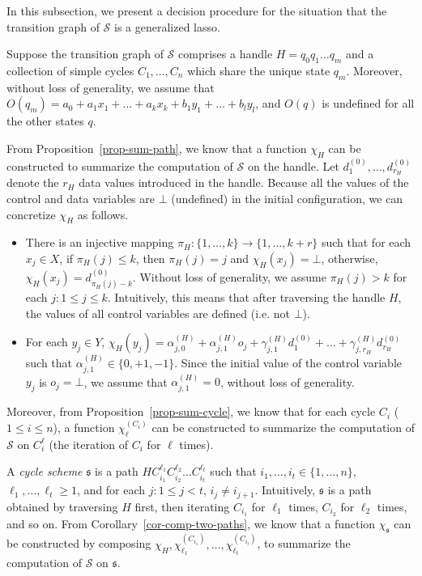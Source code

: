 \documentclass[runningheads,a4paper]{llncs}
\def\Ss{{\mathcal{S} }}
\def\schm{{\mathfrak{s} }}
\begin{document}
In this subsection, we present a decision procedure for the situation that the transition graph of $\Ss$ is a generalized lasso. 

Suppose the transition graph of $\Ss$ comprises a handle $H=q_0 q_1 \dots q_m$ and a collection of simple cycles $C_1,\dots,C_n$ which share the unique state $q_m$. Moreover, without loss of generality, we assume that $O(q_m) = a_0 + a_1 x_1 + \dots + a_k x_k + b_1 y_1 + \dots + b_l y_l$, and $O(q)$ is undefined for all the other states $q$.

From Proposition~\ref{prop-sum-path}, we know that a function $\chi_H$ can be constructed to summarize the computation of $\Ss$ on the handle. Let $d^{(0)}_{1}, \dots, d^{(0)}_{r_H}$ denote the $r_H$ data values introduced in the handle. Because all the values of the control and data variables are $\bot$ (undefined) in the initial configuration,  we can concretize $\chi_H$ as follows. 
\begin{itemize}
\item There is an injective mapping $\pi_H: \{1,\dots,k\} \rightarrow \{1,\dots, k+r\}$ such that for each $x_j \in X$, if $\pi_H(j) \le k$, then $\pi_H(j)=j$ and $\chi_H(x_j)=\bot$, otherwise, $\chi_H(x_j)=d^{(0)}_{\pi_H(j)-k}$. Without loss of generality, we assume $\pi_H(j) > k$ for each $j: 1\le j \le k$. Intuitively, this means that after traversing the handle $H$, the values of all control variables are defined (i.e. not $\bot$).
% 
\item For each $y_j \in Y$, $\chi_H(y_j) = \alpha^{(H)}_{j,0} + \alpha^{(H)}_{j,1} o_j + \gamma^{(H)}_{j,1} d^{(0)}_1 +\dots + \gamma^{(H)}_{j,r_H} d^{(0)}_{r_H}$ such that $\alpha^{(H)}_{j,1} \in \{0,+1,-1\}$. Since the initial value of the control variable $y_j$ is $o_j=\bot$, we assume that $\alpha^{(H)}_{j,1}=0$, without loss of generality.
\end{itemize}

Moreover, from Proposition~\ref{prop-sum-cycle}, we know that for each cycle $C_i$ ($1 \le i \le n$), a function $\chi^{(C_i)}_{\ell}$ can be constructed to summarize the computation of $\Ss$ on $C^{\ell}_i$ (the iteration of $C_i$ for $\ell$ times).

A \emph{cycle scheme} $\schm$ is a path $H C_{i_1}^{\ell_1} C_{i_2}^{\ell_2} \dots C_{i_t}^{\ell_t}$ such that $i_1,\dots,i_t \in \{1,\dots,n\}$, $\ell_1,\dots, \ell_t \ge 1$, and for each $j: 1 \le j < t$, $i_j \neq i_{j+1}$. Intuitively, $\schm$ is a path obtained by traversing $H$ first, then iterating $C_{i_1}$ for $\ell_1$ times, $C_{i_2}$ for $\ell_2$ times, and so on. From Corollary~\ref{cor-comp-two-paths}, we know that a function $\chi_{\schm}$ can be constructed by composing $\chi_{H}, \chi^{(C_{i_1})}_{\ell_1},\dots,\chi^{(C_{i_t})}_{\ell_t}$, to summarize the computation of $\Ss$ on $\schm$.
\end{document}
